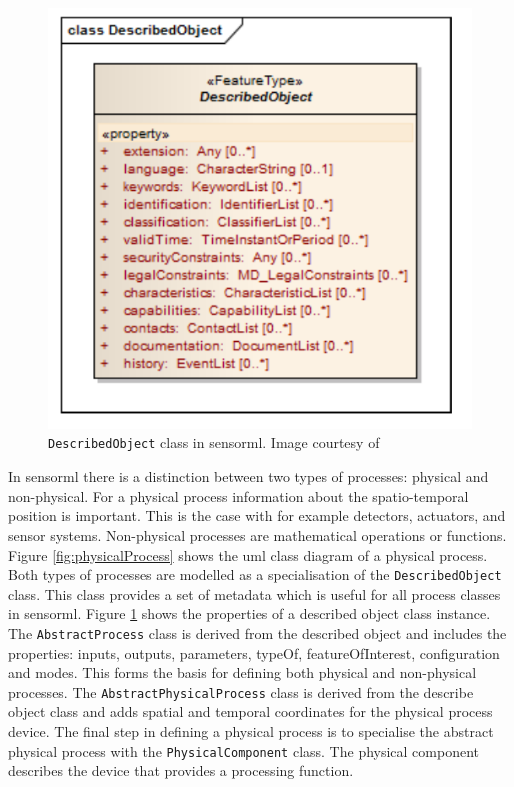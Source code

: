 \begin{figure}
	\centering
	\includegraphics[width=0.5\linewidth]{UML/describedObject.png}
	\caption{\texttt{DescribedObject} class in \ac*{sensorml}. Image courtesy of \cite[p. 39]{SW:OGC7}}
	\label{fig:describedObject}
\end{figure}

In \ac{sensorml} there is a distinction between two types of processes: physical and non-physical. For a physical process information about the spatio-temporal position is important. This is the case with for example detectors, actuators, and sensor systems. Non-physical processes are mathematical operations or functions. Figure \ref{fig:physicalProcess} shows the \ac{uml} class diagram of a physical process. Both types of processes are modelled as a specialisation of the \texttt{DescribedObject} class. This class provides a set of metadata which is useful for all process classes in \ac{sensorml}. Figure \ref{fig:describedObject} shows the properties of a described object class instance. The \texttt{AbstractProcess} class is derived from the described object and includes the properties: inputs, outputs, parameters, typeOf, featureOfInterest, configuration and modes. This forms the basis for defining both physical and non-physical processes. The \texttt{AbstractPhysicalProcess}  class is derived from the describe object class and adds spatial and temporal coordinates for the physical process device. The final step in defining a physical process is to specialise the abstract physical process with the \texttt{PhysicalComponent} class. The physical component describes the device that provides a processing function. 

